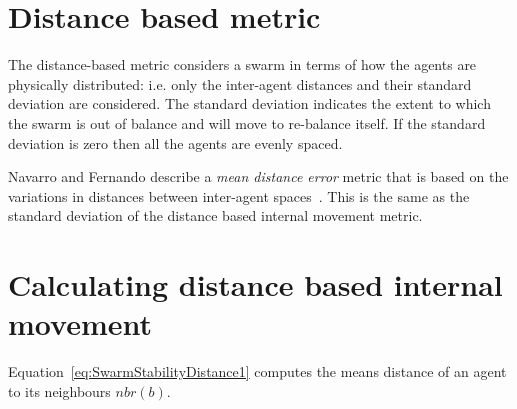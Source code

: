 \documentclass[10pt,journal,letterpaper,twoside]{IEEEtran}
\begin{document}
\section{Distance based metric\label{section:DistanceDynamics}}
The distance-based metric considers a swarm in terms of how the agents are physically distributed: i.e. only the inter-agent distances and their standard deviation are considered. The standard deviation indicates the extent to which the swarm is out of balance and will move to re-balance itself. If the standard deviation is zero then all the agents are evenly spaced. 


Navarro and Fernando describe a \textit{mean distance error} metric that is based on the variations in distances between inter-agent spaces~\cite{NIM:09}. This is the same as the standard deviation of the distance based internal movement metric. 



\section{Calculating distance based internal movement}
Equation~\ref{eq:SwarmStabilityDistance1} computes the means distance of an agent to its neighbours $nbr(b)$. 
\end{document}
